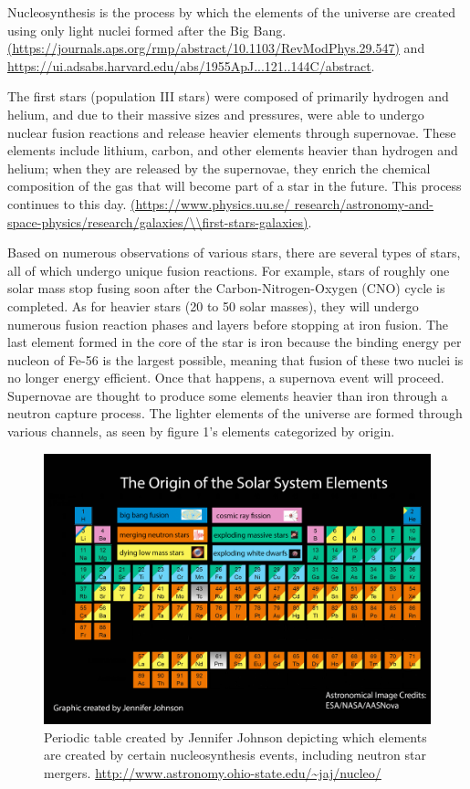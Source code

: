 \documentclass[11pt,a4paper]{article}
\begin{document}
Nucleosynthesis is the process by which the elements of the universe are created using only light nuclei formed after the Big Bang. \url{(https://journals.aps.org/rmp/abstract/10.1103/RevModPhys.29.547)} and \url{https://ui.adsabs.harvard.edu/abs/1955ApJ...121..144C/abstract}.  

The first stars (population III stars) were composed of primarily hydrogen and helium, and due to their massive sizes and pressures, were able to undergo nuclear fusion reactions and release heavier elements through supernovae. These elements include lithium, carbon, and other elements heavier than hydrogen and helium; when they are released by the supernovae, they enrich the chemical composition of the gas that will become part of a star in the future. This process continues to this day. \url{(https://www.physics.uu.se/ research/astronomy-and-space-physics/research/galaxies/\\first-stars-galaxies)}. 

Based on numerous observations of various stars, there are several types of stars, all of which undergo unique fusion reactions. For example, stars of roughly one solar mass stop fusing soon after the Carbon-Nitrogen-Oxygen (CNO) cycle is completed. As for heavier stars (20 to 50 solar masses), they will undergo numerous fusion reaction phases and layers before stopping at iron fusion. The last element formed in the core of the star is iron because the binding energy per nucleon of Fe-56 is the largest possible, meaning that fusion of these two nuclei is no longer energy efficient. Once that happens, a supernova event will proceed. Supernovae are thought to produce some elements heavier than iron through a neutron capture process. The lighter elements of the universe are formed through various channels, as seen by figure 1's elements categorized by origin.

\begin{figure}[h!]
  \includegraphics[width=1\textwidth]{periodic_table.png}
  \caption{Periodic table created by Jennifer Johnson depicting which elements are created by certain nucleosynthesis events, including neutron star mergers. \url{http://www.astronomy.ohio-state.edu/~jaj/nucleo/}}
\end{figure}
\end{document}
